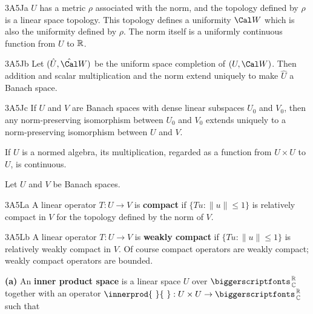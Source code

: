 \spheader 3A5Ja $U$ has a metric $\rho$ associated 
with the norm, and the topology defined by 
$\rho$ is a
linear space topology.   This topology defines a
uniformity $\Cal W$ which is also the uniformity
defined by $\rho$.   The norm itself is a uniformly
continuous function from $U$ to $\Bbb R$.

\spheader 3A5Jb Let $(\hat U,\hat\Cal W)$ be the uniform space
completion of $(U,\Cal W)$.   Then addition and scalar
multiplication and the norm extend uniquely to make $\hat U$ a Banach
space.  

\spheader 3A5Jc If $U$ and $V$ are Banach spaces with dense linear
subspaces $U_0$ and $V_0$, then any norm-preserving isomorphism between
$U_0$ and $V_0$ extends uniquely to a norm-preserving isomorphism
between $U$ and $V$.

 If $U$ is a normed
algebra, its multiplication, regarded as a function
from $U\times U$ to $U$, is continuous.

Let $U$ and $V$ be Banach spaces.

\spheader 3A5La A linear operator $T:U\to V$ is
{\bf compact}
if $\{Tu:\|u\|\le 1\}$ is relatively compact in $V$ for the topology
defined by the norm of $V$.

\spheader 3A5Lb A linear operator $T:U\to V$ is {\bf weakly compact} if
$\{Tu:\|u\|\le 1\}$ is relatively weakly compact in $V$.
Of course compact operators are weakly compact;
weakly compact operators are bounded.

 {\bf (a)} An {\bf inner product space} is a linear space $U$ over
$\RoverC$ together with an operator
$\innerprod{\,\,}{\,\,}:U\times U\to\RoverC$ such that

